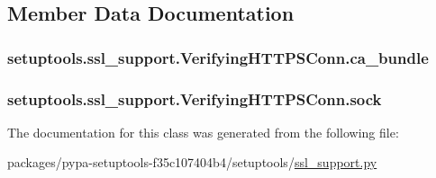 \subsection{Member Data Documentation}
\hypertarget{classsetuptools_1_1ssl__support_1_1VerifyingHTTPSConn_ae2821bf00c5c65578971e64777ebe05a}{}
\subsubsection[{ca\+\_\+bundle}]{\setlength{\rightskip}{0pt plus 5cm}setuptools.\+ssl\+\_\+support.\+Verifying\+H\+T\+T\+P\+S\+Conn.\+ca\+\_\+bundle}\label{classsetuptools_1_1ssl__support_1_1VerifyingHTTPSConn_ae2821bf00c5c65578971e64777ebe05a}
\hypertarget{classsetuptools_1_1ssl__support_1_1VerifyingHTTPSConn_a926c771230a413e8dfbd9a76c590ca18}{}
\subsubsection[{sock}]{\setlength{\rightskip}{0pt plus 5cm}setuptools.\+ssl\+\_\+support.\+Verifying\+H\+T\+T\+P\+S\+Conn.\+sock}\label{classsetuptools_1_1ssl__support_1_1VerifyingHTTPSConn_a926c771230a413e8dfbd9a76c590ca18}


The documentation for this class was generated from the following file\+:\begin{DoxyCompactItemize}
\item 
packages/pypa-\/setuptools-\/f35c107404b4/setuptools/\hyperlink{ssl__support_8py}{ssl\+\_\+support.\+py}\end{DoxyCompactItemize}
